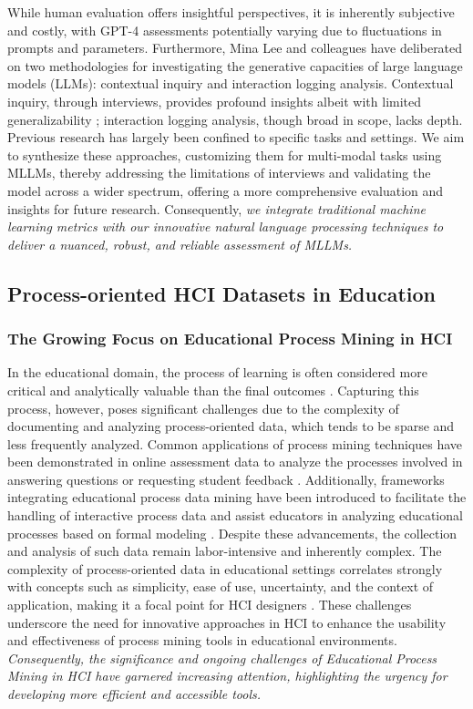 While human evaluation offers insightful perspectives, it is inherently subjective and costly, with GPT-4 assessments potentially varying due to fluctuations in prompts and parameters. Furthermore, Mina Lee and colleagues have deliberated on two methodologies for investigating the generative capacities of large language models (LLMs): contextual inquiry and interaction logging analysis. Contextual inquiry, through interviews, provides profound insights albeit with limited generalizability \cite{lee2022coauthor}; interaction logging analysis, though broad in scope, lacks depth. Previous research has largely been confined to specific tasks and settings. We aim to synthesize these approaches, customizing them for multi-modal tasks using MLLMs, thereby addressing the limitations of interviews and validating the model across a wider spectrum, offering a more comprehensive evaluation and insights for future research. Consequently, \textit{we integrate traditional machine learning metrics with our innovative natural language processing techniques to deliver a nuanced, robust, and reliable assessment of MLLMs.}
\subsection{Process-oriented HCI Datasets in Education}
\subsubsection{The Growing Focus on Educational Process Mining in HCI} In the educational domain, the process of learning is often considered more critical and analytically valuable than the final outcomes \cite{vahdat2015learning}. Capturing this process, however, poses significant challenges due to the complexity of documenting and analyzing process-oriented data, which tends to be sparse and less frequently analyzed. Common applications of process mining techniques have been demonstrated in online assessment data to analyze the processes involved in answering questions or requesting student feedback \cite{pechenizkiy2009process}. Additionally, frameworks integrating educational process data mining have been introduced to facilitate the handling of interactive process data and assist educators in analyzing educational processes based on formal modeling \cite{trcka2009local}. Despite these advancements, the collection and analysis of such data remain labor-intensive and inherently complex. The complexity of process-oriented data in educational settings correlates strongly with concepts such as simplicity, ease of use, uncertainty, and the context of application, making it a focal point for HCI designers \cite{vahdat2015learning}. These challenges underscore the need for innovative approaches in HCI to enhance the usability and effectiveness of process mining tools in educational environments. \textit{Consequently, the significance and ongoing challenges of Educational Process Mining in HCI have garnered increasing attention, highlighting the urgency for developing more efficient and accessible tools.}
